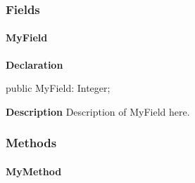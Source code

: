 \documentclass{report}
\begin{document}
\subsubsection*{\large{\textbf{Fields}}\normalsize\hspace{1ex}\hfill}
\paragraph*{MyField}\hspace*{\fill}

\begin{list}{}{
\setlength{\itemindent}{0cm}
\setlength{\listparindent}{0cm}
\setlength{\leftmargin}{\evensidemargin}
\addtolength{\leftmargin}{\tmplength}
\settowidth{\labelsep}{X}
\addtolength{\leftmargin}{\labelsep}
\setlength{\labelwidth}{\tmplength}
}
\begin{flushleft}
\item[\textbf{Declaration}\hfill]
\begin{ttfamily}
public MyField: Integer;\end{ttfamily}


\end{flushleft}
\par
\item[\textbf{Description}]
Description of MyField here.

\end{list}
\subsubsection*{\large{\textbf{Methods}}\normalsize\hspace{1ex}\hfill}
\paragraph*{MyMethod}\hspace*{\fill}
\end{document}
